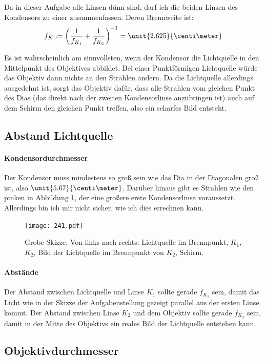 \documentclass[11pt, ngerman, fleqn]{article}
\begin{document}
Da in dieser Aufgabe alle Linsen dünn sind, darf ich die beiden Linsen des
Kondensors zu einer zusammenfassen. Deren Brennweite ist:
\[
	f_K := \del{\frac 1{f_{K_1}} + \frac 1{f_{K_2}}}^{-1}
	= \unit{2.625}{\centi\meter}
\]

Es ist wahrscheinlich am sinnvollsten, wenn der Kondensor die Lichtquelle in
den Mittelpunkt des Objektives abbildet. Bei einer Punktförmigen Lichtquelle
würde das Objektiv dann nichts an den Strahlen ändern. Da die Lichtquelle
allerdings ausgedehnt ist, sorgt das Objektiv dafür, dass alle Strahlen vom
gleichen Punkt des Dias (das direkt nach der zweiten Kondensorlinse anzubringen
ist) auch auf dem Schirm den gleichen Punkt treffen, also ein scharfes Bild
entsteht.

\subsection{Abstand Lichtquelle}

\paragraph{Kondensordurchmesser}

Der Kondensor muss mindestens so groß sein wie das Dia in der Diagonalen groß
ist, also $\unit{5.67}{\centi\meter}$. Darüber hinaus gibt es Strahlen wie den
pinken in Abbildung \ref{241}, der eine großere erste Kondensorlinse
voraussetzt. Allerdings bin ich mir nicht sicher, wie ich dies errechnen kann.

\begin{figure}
	\centering
	\texttt{[image: 241.pdf]}
	\caption{%
	Grobe Skizze. Von links nach rechts: Lichtquelle im Brennpunkt, $K_1$,
	$K_2$, Bild der Lichtquelle im Brennpunkt von $K_2$, Schirm.
	}
	\label{241}
\end{figure}

\paragraph{Abstände}

Der Abstand zwischen Lichtquelle und Linse $K_1$ sollte gerade $f_{K_1}$ sein,
damit das Licht wie in der Skizze der Aufgabenstellung gezeigt parallel aus der
ersten Linse kommt. Der Abstand zwischen Linse $K_2$ und dem Objektiv sollte
gerade $f_{K_2}$ sein, damit in der Mitte des Objektivs ein reales Bild der
Lichtquelle entstehen kann.

\subsection{Objektivdurchmesser}
\end{document}
